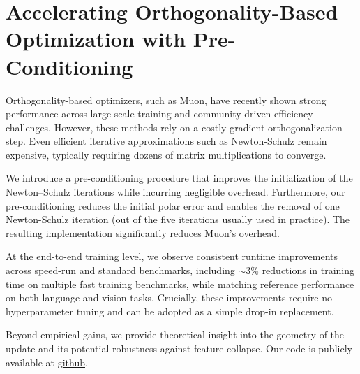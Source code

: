 \chapter{Accelerating Orthogonality-Based Optimization with Pre-Conditioning}
\label{ch:turbo_muon}

\newcommand{\turbomuon}{Turbo-Muon }

Orthogonality-based optimizers, such as Muon, have recently shown strong performance across large-scale training and community-driven efficiency challenges. However, these methods rely on a costly gradient orthogonalization step. Even efficient iterative approximations such as Newton-Schulz remain expensive, typically requiring dozens of matrix multiplications to converge.

We introduce a pre-conditioning procedure that improves the initialization of the Newton–Schulz iterations while incurring negligible overhead.
Furthermore, our pre-conditioning reduces the initial polar error and enables the removal of one Newton-Schulz iteration (out of the five iterations usually used in practice). 
The resulting implementation significantly reduces Muon’s overhead.

At the end-to-end training level, we observe consistent runtime improvements across speed-run and standard benchmarks, including $\sim3\%$ reductions in training time
 on multiple fast training benchmarks, while matching reference performance on both language and vision tasks. Crucially, these improvements require no hyperparameter tuning and can be adopted as a simple drop-in replacement.

Beyond empirical gains, we provide theoretical insight into the geometry of the update and its potential robustness against feature collapse.
Our code is publicly available at 
 \href{https://github.com/thib-s/flash-newton-schulz/}{github}.




